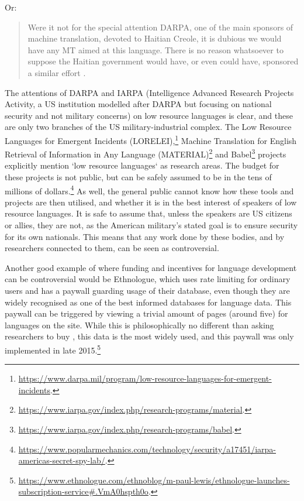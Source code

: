 Or:

\begin{quote}
Were it not for the special attention DARPA, one of the main sponsors of machine translation, devoted to Haitian Creole, it is dubious we would have any MT aimed at this language. There is no reason whatsoever to suppose the Haitian government would have, or even could have, sponsored a similar effort \citep{spice}. \citep[9]{kornai2013digital}
\end{quote}

The attentions of DARPA and IARPA (Intelligence Advanced Research Proj\-ects Activity, a US institution modelled after DARPA but focusing on national security and not military concerns) on low resource languages is clear, and these are only two branches of the US military-industrial complex. The Low Resource Languages for Emergent Incidents (LORELEI),\footnote{\href{https://www.darpa.mil/program/low-resource-languages-for-emergent-incidents}{https://www.darpa.mil/program/low-resource-languages-for-emergent-incidents}. } Machine Translation for English Retrieval of Information in Any Language (MATERIAL)\footnote{\href{https://www.iarpa.gov/index.php/research-programs/material}{https://www.iarpa.gov/index.php/research-programs/material}. } and Babel\footnote{\href{https://www.iarpa.gov/index.php/research-programs/babel}{https://www.iarpa.gov/index.php/research-programs/babel}. } projects explicitly mention `low resource languages` as research areas. The budget for these projects is not public, but can be safely assumed to be in the tens of millions of dollars.\footnote{\href{https://www.popularmechanics.com/technology/security/a17451/iarpa-americas-secret-spy-lab/}{https://www.popularmechanics.com/technology/security/a17451/iarpa-americas-secret-spy-lab/}. } As well, the general public cannot know how these tools and projects are then utilised, and whether it is in the best interest of speakers of low resource languages. It is safe to assume that, unless the speakers are US citizens or allies, they are not, as the American military's stated goal is to ensure security for its own nationals. This means that any work done by these bodies, and by researchers connected to them, can be seen as controversial.

Another good example of where funding and incentives for language development can be controversial would be Ethnologue, which uses rate limiting for ordinary users and has a paywall guarding usage of their database, even though they are widely recognised as one of the best informed databases for language data. This paywall can be triggered by viewing a trivial amount of pages (around five) for languages on the site. While this is philosophically no different than asking researchers to buy \citet{lewis2009ethnologue}, this data is the most widely used, and this paywall was only implemented in late 2015.\footnote{\href{https://www.ethnologue.com/ethnoblog/m-paul-lewis/ethnologue-launches-subscription-service\#.VmA0hspth0o}{https://www.ethnologue.com/ethnoblog/m-paul-lewis/ethnologue-launches-subscription-service\#.VmA0hspth0o}. }


